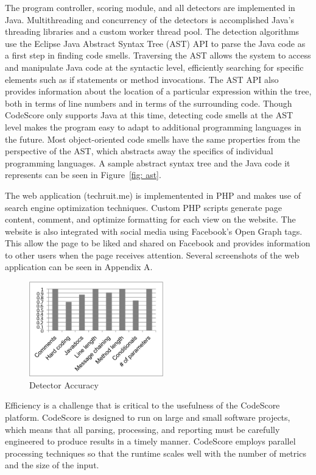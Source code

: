 \documentclass{sig-alternate}
\begin{document}
The program controller, scoring module, and all detectors are implemented in
Java. Multithreading and concurrency of the detectors is accomplished Java's threading libraries
and a custom worker thread pool. The detection algorithms use the Eclipse Java Abstract 
Syntax Tree (AST) API to parse the
Java code as a first step in finding code smells. Traversing the AST allows the
system to access and manipulate Java code at the syntactic level, efficiently searching
for specific elements such as if statements or method invocations. The AST API also
provides information about the location of a particular expression within the
tree, both in terms of line numbers and in terms of the surrounding code.  
Though CodeScore only supports Java at this time, detecting code smells at the AST level 
makes the program easy to adapt to additional programming languages in the future.
Most object-oriented code smells have the same properties from the perspective of the AST,
which abstracts away the specifics of individual programming languages. A sample
abstract syntax tree and the Java code it represents can be seen in Figure~\ref{fig: ast}.

The web application (techruit.me) is implementented in PHP and makes use of search engine
optimization techniques. Custom PHP scripts generate page content, comment, and optimize
formatting for each view on the website. The website is also integrated with
social media using Facebook's Open Graph tags. This allow the page to be liked and shared on
Facebook and provides information to other users when the page receives
attention. Several screenshots of the web application can be seen in Appendix
A.

\begin{figure}[ht!]
	\begin{center}
		\includegraphics[width=220px]{accuracy}
	\end{center}
	\vspace{-12pt}
	\caption{Detector Accuracy}
	\label{fig: acc}
\end{figure}


Efficiency is a challenge that is critical to the usefulness of the CodeScore
platform. CodeScore is designed to run
on large and small software projects, which means that all parsing, processing,
and reporting must be carefully engineered to produce results in a timely
manner. CodeScore employs parallel processing techniques so that the runtime
scales well with the number of metrics and the size of the input.
\end{document}
